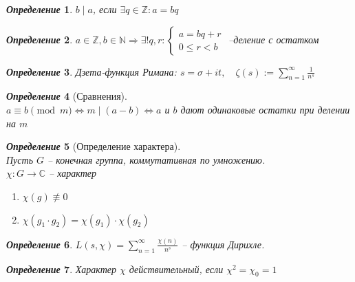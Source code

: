 \documentclass[a4paper,12pt]{article}
\newtheorem{deff2}{\textit{Определение}}
\newcommand{\ee}{\equiv}
\newcommand{\q}{\quad}
\newcommand{\bb}[1]{\mathbb{#1}}
\newcommand{\SL}{\sum\limits}
\begin{document}
\begin{formbox}{}
\begin{deff2} $b\mid a$, если $\exists q\in \mathbb{Z}: a=bq$
\end{deff2}
\end{formbox}
\begin{formbox}{}
\begin{deff2} $a\in \bb{Z}, b\in\bb{N}\Rightarrow \exists ! q,r: \begin{cases} a = bq+r\\0 \le r < b\end{cases} $ --деление с остатком
\end{deff2}
\end{formbox}
\begin{formbox}{}
\begin{deff2}
Дзета-функция Римана: $s = \sigma + it, \q\zeta (s) := \SL_{n=1}^\infty \frac{1}{n^s}$
\end{deff2}
\end{formbox}
\begin{formbox}{}
\begin{deff2}[Сравнения]\q\\
$a \ee b \pmod{m}\iff m\mid (a-b) \iff a$ и $b$ дают одинаковые остатки при делении на $m$
\end{deff2}
\end{formbox}
\begin{formbox}{}
\begin{deff2} [Определение характера]\q\\
Пусть $G$ -- конечная группа, коммутативная по умножению.\\
$\chi:G\to\bb{C}$ -- характер
\begin{enumerate}
\item $\chi(g) \not\ee0 $
\item $\chi(g_1 \cdot g_2) = \chi(g_1)\cdot \chi(g_2)  $
\end{enumerate}
\end{deff2}
\end{formbox}
\begin{formbox}{}
\begin{deff2}
$L(s,\chi) = \SL_{n=1}^\infty \frac{\chi(n)}{n^s}$ -- функция Дирихле.
\end{deff2}
\end{formbox}
\begin{formbox}{}
\begin{deff2} Характер $\chi$ действительный, если $\chi^2 = \chi_0 = 1$
\end{deff2}
\end{formbox}
\end{document}
